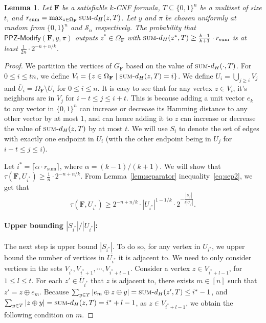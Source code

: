 \documentclass[11pt, letterpaper]{article}
\newtheorem{lemma}[theorem]{Lemma}
\theoremstyle{definition}
\newcommand{\f}{\mathbf{F}}
\newcommand{\Om}{\Omega_{\f}}
\newcommand{\sumd}{\textsc{sum-}d_H}
\newcommand{\PPZMod}{\textsf{PPZ-Modify}}
\begin{document}
\begin{lemma}\label{lem:anchor:sum}
    Let $\f$ be a satisfiable $k$-CNF formula, $T \subseteq \{0,1\}^n$ be a multiset of size $t$, and $r_{\text{sum}}= \max_{z \in \Om}\sumd (z,T)$. Let $y$ and $\pi$ be chosen uniformly at random from $\{0,1\}^n$ and $\mathcal{S}_n$ respectively. The probability that $\PPZMod(\f, y, \pi)$ outputs $z^* \in \Om$ with $\sumd(z^*,T) \geq \frac{k-1}{k+1} \cdot r_{\text{sum}}$ is at least $ \frac{1}{2n} \cdot 2^{-n+n/k}$. 
\end{lemma}
\begin{proof}
    We partition the vertices of $G_\f$ based on the value of $\sumd(\cdot, T)$. For $ 0\leq i \leq tn$, we define $V_i = \{ z \in \Om \mid \sumd(z,T) = i\}$. We define $U_i = \bigcup_{j \geq i} V_j$ and $\overline{U}_{i}  = \Om \setminus U_i$ for $0 \leq i \leq n$. It is easy to see that for any vertex $z \in V_i$, it's neighbors are in $V_j$ for $i-t \leq j \leq i+t$. This is because adding a unit vector $e_k$ to any vector in $\{0,1\}^n$ can increase or decrease its Hamming distance to any other vector by at most $1$, and can hence adding it to $z$ can increase or decrease the value of $\sumd(z, T)$ by at most $t$. We will use $S_i$ to denote the set of edges with exactly one endpoint in $U_i$ (with the other endpoint being in $U_j$ for $i-t \leq j \leq i$). 

    Let $i^* = \lceil \alpha \cdot r_{\text{sum}} \rceil$, where $\alpha=(k-1)/(k+1)$. We will show that $\tau(\f, U_{i^*}) \geq \frac{1}{n} \cdot 2^{-n+n/k}$. From Lemma~\ref{lem:separator} inequality~\ref{eq:sep2}, we get that \[\tau(\f, U_{i^*}) \geq 2^{-n+n/k} \cdot |U_{i^*}|^{1-1/k} \cdot 2^{-\frac{|S_{i^*}|}{k|U_{i^*}|}}.\]
    
    \paragraph{Upper bounding $|S_{i^*}|/|U_{i^*}|$: }The next step is upper bound $|S_{i^*}|$. To do so, for any vertex in $U_{i^*}$, we upper bound the number of vertices in $\overline{U_{i^*}}$ it is adjacent to. We need to only consider vertices in the sets $V_{i^*}, V_{i^*+1}, \cdots, V_{i^*+t-1}$. Consider a vertex $z \in V_{i^*+l-1}$, for $1 \leq l \leq t$. For each $z' \in  \overline{U}_{i^*}$ that $z$ is adjacent to, there exists $m \in [n]$ such that $z' = z \oplus e_m$. Because $\sum_{y \in T} |e_m \oplus z \oplus y|=\sumd(z', T) \leq i^*-1$, and $\sum_{y \in T} |z \oplus y|=\sumd(z,T)=i^*+l-1$, as $z \in V_{i^*+l-1}$, we obtain the following condition on $m$. 


\end{proof}
\end{document}
